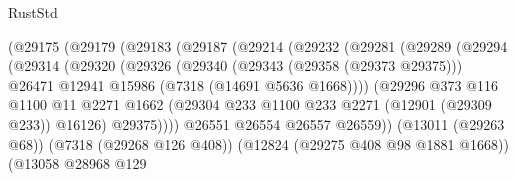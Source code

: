 \begin{lexlean}{RustStd}
\begin{coremodule}
                                (@29175
                                  (@29179
                                    (@29183
                                      (@29187
                                        (@29214
                                          (@29232
                                            (@29281
                                              (@29289
                                                (@29294
                                                  (@29314
                                                    (@29320
                                                      (@29326
                                                        (@29340
                                                          (@29343 (@29358 (@29373 @29375)))
                                                          @26471
                                                          @12941
                                                          @15986
                                                          (@7318 (@14691 @5636 @1668))))
                                                      (@29296
                                                        @373
                                                        @116
                                                        @1100
                                                        @11
                                                        @2271
                                                        @1662
                                                        (@29304
                                                          @233
                                                          @1100
                                                          @233
                                                          @2271
                                                          (@12901 (@29309 @233))
                                                          @16126)
                                                        @29375))))
                                                @26551
                                                @26554
                                                @26557
                                                @26559))
                                            (@13011 (@29263 @68))
                                            (@7318 (@29268 @126 @408))
                                            (@12824 (@29275 @408 @98 @1881 @1668))
                                            (@13058
                                              @28968
                                              @129

\end{coremodule}
\end{lexlean}
